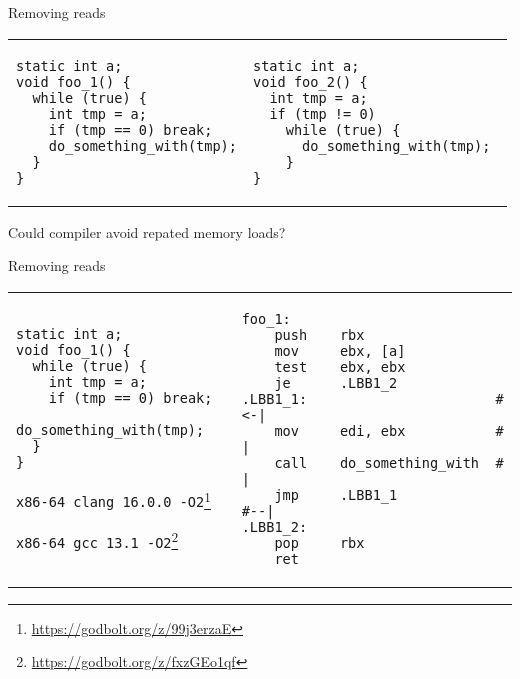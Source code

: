 \begin{frame}{Removing reads}

\begin{tabular}{p{} p{}}

\begin{verbatim}
static int a;
void foo_1() {
  while (true) {
    int tmp = a;
    if (tmp == 0) break;
    do_something_with(tmp);
  }
}
\end{verbatim}

&

\begin{verbatim}
static int a;
void foo_2() {
  int tmp = a;
  if (tmp != 0)
    while (true) { 
      do_something_with(tmp); 
    }
}
\end{verbatim}
\end{tabular}

Could compiler avoid repated memory loads?
\end{frame}


\begin{frame}{Removing reads}

\begin{tabular}{p{} p{}}


\begin{verbatim}
static int a;
void foo_1() {
  while (true) {
    int tmp = a;
    if (tmp == 0) break;
    do_something_with(tmp);
  }
}
\end{verbatim}

\texttt{x86-64 clang 16.0.0 -O2}\footnote{\tiny\url{https://godbolt.org/z/99j3erzaE}}

\texttt{x86-64 gcc 13.1 -O2}\footnote{\tiny\url{https://godbolt.org/z/fxzGEo1qf}}

&

\begin{verbatim}
foo_1:                                  
    push    rbx
    mov     ebx, [a]
    test    ebx, ebx
    je      .LBB1_2
.LBB1_1:                       #<-|    
    mov     edi, ebx           #  |
    call    do_something_with  #  |
    jmp     .LBB1_1            #--|
.LBB1_2:
    pop     rbx
    ret
\end{verbatim}

\end{tabular}

\end{frame}



